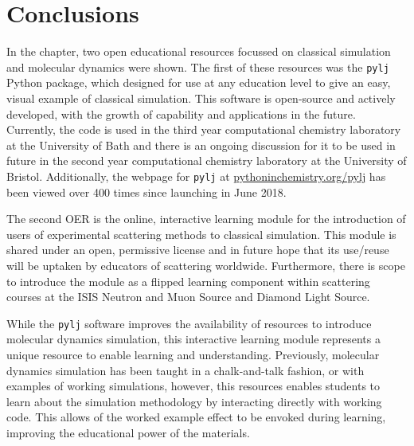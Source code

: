 \section{Conclusions}
In the chapter, two open educational resources focussed on classical simulation and molecular dynamics were shown.
The first of these resources was the \texttt{pylj} Python package, which designed for use at any education level to give an easy, visual example of classical simulation.
This software is open-source and actively developed, with the growth of capability and applications in the future.
Currently, the code is used in the third year computational chemistry laboratory at the University of Bath and there is an ongoing discussion for it to be used in future in the second year computational chemistry laboratory at the University of Bristol.
Additionally, the webpage for \texttt{pylj} at \href{https://pythoninchemistry.org/pylj}{pythoninchemistry.org/pylj} has been viewed over 400 times since launching in June 2018.

The second OER is the online, interactive learning module for the introduction of users of experimental scattering methods to classical simulation.
This module is shared under an open, permissive license and in future hope that its use/reuse will be uptaken by educators of scattering worldwide.
Furthermore, there is scope to introduce the module as a flipped learning component \cite{noauthor_flipped_nodate} within scattering courses at the ISIS Neutron and Muon Source and Diamond Light Source.

While the \texttt{pylj} software improves the availability of resources to introduce molecular dynamics simulation, this interactive learning module represents a unique resource to enable learning and understanding.
Previously, molecular dynamics simulation has been taught in a chalk-and-talk fashion, or with examples of working simulations, however, this resources enables students to learn about the simulation methodology by interacting directly with working code.
This allows of the worked example effect to be envoked during learning, improving the educational power of the materials.
